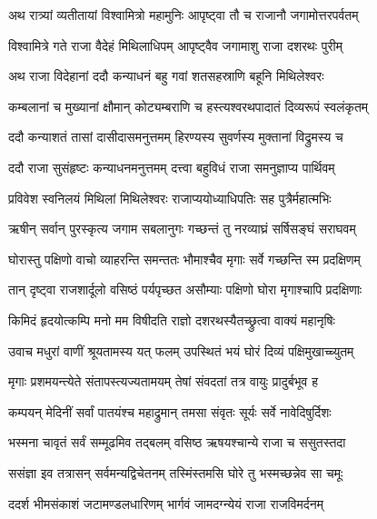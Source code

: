 
\twolineshloka
{अथ रात्र्यां व्यतीतायां विश्वामित्रो महामुनिः}
{आपृष्ट्वा तौ च राजानौ जगामोत्तरपर्वतम्} %

\twolineshloka
{विश्वामित्रे गते राजा वैदेहं मिथिलाधिपम्}
{आपृष्ट्वैव जगामाशु राजा दशरथः पुरीम्} %

\twolineshloka
{अथ राजा विदेहानां ददौ कन्याधनं बहु}
{गवां शतसहस्राणि बहूनि मिथिलेश्वरः} %

\twolineshloka
{कम्बलानां च मुख्यानां क्षौमान् कोट्यम्बराणि च}
{हस्त्यश्वरथपादातं दिव्यरूपं स्वलंकृतम्} %

\twolineshloka
{ददौ कन्याशतं तासां दासीदासमनुत्तमम्}
{हिरण्यस्य सुवर्णस्य मुक्तानां विद्रुमस्य च} %

\twolineshloka
{ददौ राजा सुसंहृष्टः कन्याधनमनुत्तमम्}
{दत्त्वा बहुविधं राजा समनुज्ञाप्य पार्थिवम्} %

\twolineshloka
{प्रविवेश स्वनिलयं मिथिलां मिथिलेश्वरः}
{राजाप्ययोध्याधिपतिः सह पुत्रैर्महात्मभिः} %

\twolineshloka
{ऋषीन् सर्वान् पुरस्कृत्य जगाम सबलानुगः}
{गच्छन्तं तु नरव्याघ्रं सर्षिसङ्घं सराघवम्} %

\twolineshloka
{घोरास्तु पक्षिणो वाचो व्याहरन्ति समन्ततः}
{भौमाश्चैव मृगाः सर्वे गच्छन्ति स्म प्रदक्षिणम्} %

\twolineshloka
{तान् दृष्ट्वा राजशार्दूलो वसिष्ठं पर्यपृच्छत}
{असौम्याः पक्षिणो घोरा मृगाश्चापि प्रदक्षिणाः} %

\twolineshloka
{किमिदं हृदयोत्कम्पि मनो मम विषीदति}
{राज्ञो दशरथस्यैतच्छ्रुत्वा वाक्यं महानृषिः} %

\twolineshloka
{उवाच मधुरां वाणीं श्रूयतामस्य यत् फलम्}
{उपस्थितं भयं घोरं दिव्यं पक्षिमुखाच्च्युतम्} %

\twolineshloka
{मृगाः प्रशमयन्त्येते संतापस्त्यज्यतामयम्}
{तेषां संवदतां तत्र वायुः प्रादुर्बभूव ह} %

\twolineshloka
{कम्पयन् मेदिनीं सर्वां पातयंश्च महाद्रुमान्}
{तमसा संवृतः सूर्यः सर्वे नावेदिषुर्दिशः} %

\twolineshloka
{भस्मना चावृतं सर्वं सम्मूढमिव तद्बलम्}
{वसिष्ठ ऋषयश्चान्ये राजा च ससुतस्तदा} %

\twolineshloka
{ससंज्ञा इव तत्रासन् सर्वमन्यद्विचेतनम्}
{तस्मिंस्तमसि घोरे तु भस्मच्छन्नेव सा चमूः} %

\twolineshloka
{ददर्श भीमसंकाशं जटामण्डलधारिणम्}
{भार्गवं जामदग्न्येयं राजा राजविमर्दनम्} %

